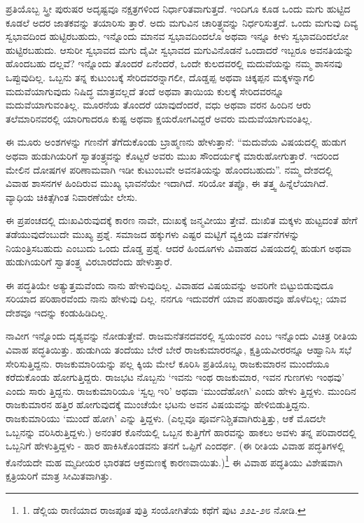 ಪ್ರತಿಯೊಬ್ಬ ಸ್ತ್ರೀ ಪುರುಷರ ಅದೃಷ್ಟವೂ ನಕ್ಷತ್ರಗಳಿಂದ ನಿರ್ಧಾರಿತವಾಗುತ್ತದೆ. ಇಂದಿಗೂ ಕೂಡ ಒಂದು ಮಗು ಹುಟ್ಟಿದ ಕೂಡಲೆ ಅದರ ಜಾತಕವನ್ನು ತಯಾರಿಸು ತ್ತಾರೆ. ಅದು ಮಗುವಿನ ಚಾರಿತ್ರ್ಯವನ್ನು ನಿರ್ಧರಿಸುತ್ತದೆ. ಒಂದು ಮಗುವು ದಿವ್ಯ ಸ್ವಭಾವದಿಂದ ಹುಟ್ಟಿರಬಹುದು, ಇನ್ನೊಂದು ಮಾನವ ಸ್ವಭಾವದಿಂದಲೊ ಅಥವಾ ಇನ್ನೂ ಕೀಳು ಸ್ವಭಾವದಿಂದಲೋ ಹುಟ್ಟಿರಬಹುದು. ಆಸುರೀ ಸ್ವಭಾವದ ಮಗು ದೈವೀ ಸ್ವಭಾವದ ಮಗುವಿನೊಡನೆ ಒಂದಾದರೆ ಇಬ್ಬರೂ ಅವನತಿಯನ್ನು ಹೊಂದಬಹು ದಲ್ಲವೆ? ಇನ್ನೊಂದು ತೊಂದರೆ ಏನೆಂದರೆ, ಒಂದೇ ಕುಲದವರಲ್ಲಿ ಮದುವೆಯನ್ನು ನಮ್ಮ ಶಾಸನವು ಒಪ್ಪುವುದಿಲ್ಲ. ಒಬ್ಬನು ತನ್ನ ಕುಟುಂಬಕ್ಕೆ ಸೇರಿದವರನ್ನಾಗಲೀ, ದೊಡ್ಡಪ್ಪ ಅಥವಾ ಚಿಕ್ಕಪ್ಪನ ಮಕ್ಕಳನ್ನಾಗಲಿ ಮದುವೆಯಾಗುವುದು ನಿಷಿದ್ಧ ಮಾತ್ರವಲ್ಲದೆ ತಂದೆ ಅಥವಾ ತಾಯಿಯ ಕುಲಕ್ಕೆ ಸೇರಿದವರನ್ನೂ ಮದುವೆಯಾಗುವಂತಿಲ್ಲ. ಮೂರನೆಯ ತೊಂದರೆ ಯಾವುದೆಂದರೆ, ವಧು ಅಥವಾ ವರನ ಹಿಂದಿನ ಆರು ತಲೆಮಾರಿನವರಲ್ಲಿ ಯಾರಿಗಾದರೂ ಕುಷ್ಟ ಅಥವಾ ಕ್ಷಯರೋಗವಿದ್ದರೆ ಅವರು ಮದುವೆಯಾಗುವಂತಿಲ್ಲ.

ಈ ಮೂರು ಅಂಶಗಳನ್ನು ಗಣನೆಗೆ ತೆಗೆದುಕೊಂಡು ಬ್ರಾಹ್ಮಣನು ಹೇಳುತ್ತಾನೆ: “ಮದುವೆಯ ವಿಷಯದಲ್ಲಿ ಹುಡುಗ ಅಥವಾ ಹುಡುಗಿಯರಿಗೆ ಸ್ವಾತಂತ್ರ್ಯವನ್ನು ಕೊಟ್ಟರೆ ಅವರು ಮುಖ ಸೌಂದರ್ಯಕ್ಕೆ ಮಾರುಹೋಗುತ್ತಾರೆ. ಇದರಿಂದ ಮೇಲಿನ ದೋಷಗಳ ಪರಿಣಾಮವಾಗಿ ಇಡೀ ಕುಟುಂಬವೇ ಅವನತಿಯನ್ನು ಹೊಂದಬಹುದು”. ನಮ್ಮ ದೇಶದಲ್ಲಿ ವಿವಾಹ ಶಾಸನಗಳ ಹಿಂದಿರುವ ಮುಖ್ಯ ಭಾವನೆಯೇ ಇದಾಗಿದೆ. ಸರಿಯೋ ತಪ್ಪೊ, ಈ ತತ್ತ್ವ ಹಿನ್ನೆಲೆಯಾಗಿದೆ. ವ್ಯಾಧಿಯ ಚಿಕಿತ್ಸೆಗಿಂತ ನಿವಾರಣೆಯೇ ಲೇಸು.

ಈ ಪ್ರಪಂಚದಲ್ಲಿ ದುಃಖವಿರುವುದಕ್ಕೆ ಕಾರಣ ನಾವೇ, ದುಃಖಕ್ಕೆ ಜನ್ಮವೀಯು ತ್ತೇವೆ. ದುಃಖಿತ ಮಕ್ಕಳು ಹುಟ್ಟದಂತೆ ಹೇಗೆ ತಡೆಯುವುದೆಂಬುದೇ ಮುಖ್ಯ ಪ್ರಶ್ನೆ. ಸಮಾಜದ ಹಕ್ಕುಗಳು ಎಷ್ಟರ ಮಟ್ಟಿಗೆ ವ್ಯಕ್ತಿಯ ವರ್ತನೆಗಳನ್ನು ನಿಯಂತ್ರಿಸಬಹುದು ಎಂಬುದು ಒಂದು ದೊಡ್ಡ ಪ್ರಶ್ನೆ. ಆದರೆ ಹಿಂದೂಗಳು ವಿವಾಹದ ವಿಷಯದಲ್ಲಿ ಹುಡುಗ ಅಥವಾ ಹುಡುಗಿಯರಿಗೆ ಸ್ವಾತಂತ್ರ್ಯ ವಿರಬಾರದೆಂದು ಹೇಳುತ್ತಾರೆ.

ಈ ಪದ್ಧತಿಯೇ ಅತ್ಯುತ್ತಮವೆಂದು ನಾನು ಹೇಳುವುದಿಲ್ಲ. ವಿವಾಹದ ವಿಷಯವನ್ನು ಅವರಿಗೇ ಬಿಟ್ಟುಬಿಡುವುದೂ ಸರಿಯಾದ ಪರಿಹಾರವೆಂದು ನಾನು ಹೇಳುವು ದಿಲ್ಲ. ನನಗೂ ಇದುವರೆಗೆ ಯಾವ ಪರಿಹಾರವೂ ಹೊಳೆದಿಲ್ಲ; ಯಾವ ದೇಶವೂ ಇದನ್ನು ಕಂಡುಹಿಡಿದಿಲ್ಲ.

ನಾವೀಗ ಇನ್ನೊಂದು ದೃಶ್ಯವನ್ನು ನೋಡುತ್ತೇವೆ. ರಾಜಮನೆತನದವರಲ್ಲಿ ಸ್ವಯಂವರ ಎಂಬ ಇನ್ನೊಂದು ವಿಚಿತ್ರ ರೀತಿಯ ವಿವಾಹ ಪದ್ಧತಿಯಿತ್ತು. ಹುಡುಗಿಯ ತಂದೆಯು ಬೇರೆ ಬೇರೆ ರಾಜಕುಮಾರರನ್ನೂ, ಕ್ಷತ್ರಿಯವೀರರನ್ನೂ ಆಹ್ವಾನಿಸಿ ಸಭೆ ಸೇರಿಸುತ್ತಿದ್ದನು. ರಾಜಕುಮಾರಿಯನ್ನು ಪಲ್ಲ ಕ್ಕಿಯ ಮೇಲೆ ಕೂರಿಸಿ ಪ್ರತಿಯೊಬ್ಬ ರಾಜಕುಮಾರನ ಮುಂದೆಯೂ ಕರೆದುಕೊಂಡು ಹೋಗುತ್ತಿದ್ದರು. ರಾಜಭಟ ನೊಬ್ಬನು ‘ಇವನು ಇಂಥ ರಾಜಕುಮಾರ, ಇವನ ಗುಣಗಳು ಇಂಥವು’ ಎಂದು ಸಾರು ತ್ತಿದ್ದನು. ರಾಜಕುಮಾರಿಯೂ ‘ಸ್ವಲ್ಪ ಇರಿ’ ಅಥವಾ ‘ಮುಂದೆಹೋಗಿ’ ಎಂದು ಹೇಳು ತ್ತಿದ್ದಳು. ಮುಂದಿನ ರಾಜಕುಮಾರನ ಹತ್ತಿರ ಹೋಗುವುದಕ್ಕೆ ಮುಂಚೆಯೇ ಭಟನು ಅವನ ವಿಷಯವನ್ನು ಹೇಳಿಬಿಡುತ್ತಿದ್ದನು. ರಾಜಕುಮಾರಿಯು ‘ಮುಂದೆ ಹೋಗಿ’ ಎನ್ನು ತ್ತಿದ್ದಳು. (ಎಲ್ಲವೂ ಪೂರ್ವನಿಶ್ಚಿತವಾಗಿರುತ್ತಿತ್ತು, ಆಕೆ ಮೊದಲೇ ಒಬ್ಬನನ್ನು ವರಿಸಿರುತ್ತಿದ್ದಳು.) ಅನಂತರ ಕೊನೆಯಲ್ಲಿ ಒಬ್ಬನ ಕುತ್ತಿಗೆಗೆ ಹಾರವನ್ನು ಹಾಕಲು ಅವಳು ತನ್ನ ಪರಿವಾರದಲ್ಲಿ ಒಬ್ಬನಿಗೆ ಹೇಳುತ್ತಿದ್ದಳು - ಹಾರ ಹಾಕಿಸಿಕೊಂಡವನು ತನಗೆ ಒಪ್ಪಿಗೆ ಎಂದರ್ಥ. (ಈ ರೀತಿಯ ವಿವಾಹ ಪದ್ಧತಿಗಳಲ್ಲಿ ಕೊನೆಯದೇ ಮಹ ಮ್ಮದೀಯರ ಭಾರತದ ಆಕ್ರಮಣಕ್ಕೆ ಕಾರಣವಾಯಿತು.)\footnote{1. ಡೆಲ್ಲಿಯ ರಾಣಿಯಾದ ರಾಜಪೂತ ಪುತ್ರಿ ಸಂಯೋಗಿತೆಯ ಕಥೆಗೆ ಪುಟ ೨೨೭-೨೮ ನೋಡಿ.} ಈ ವಿವಾಹ ಪದ್ಧತಿಯು ವಿಶೇಷವಾಗಿ ಕ್ಷತ್ರಿಯರಿಗೆ ಮಾತ್ರ ಸೀಮಿತವಾಗಿತ್ತು.

